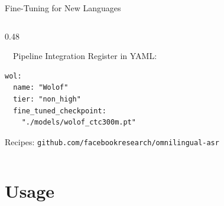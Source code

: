 \documentclass[aspectratio=169, 11pt]{beamer}
\begin{document}
\begin{frame}[fragile]{Fine-Tuning for New Languages}
\begin{columns}[T]
\begin{column}{0.48\textwidth}
\begin{block}{\faCode\ \ Pipeline Integration}
                \vspace{0.2em}
                Register in YAML:
                \begin{lstlisting}[basicstyle=\ttfamily\tiny, frame=none, backgroundcolor=\color{lightbg}]
wol:
  name: "Wolof"
  tier: "non_high"
  fine_tuned_checkpoint:
    "./models/wolof_ctc300m.pt"
                \end{lstlisting}
                \vspace{0.1em}
                \scriptsize
                Recipes: \tiny\texttt{github.com/facebookresearch/omnilingual-asr}
            \end{block}
        \end{column}
    \end{columns}
\end{frame}

\section{Usage}
\end{document}
